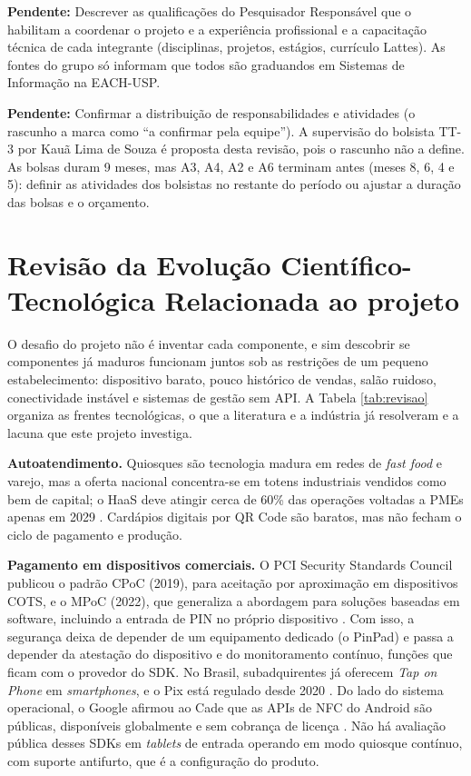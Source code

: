 \documentclass[12pt,a4paper]{article}
\newcommand{\pendente}[1]{\begin{pendbox}\textbf{\color{pendfg}Pendente:} #1\end{pendbox}}
\begin{document}
\pendente{Descrever as qualificações do Pesquisador Responsável que o habilitam a coordenar o projeto e a experiência profissional e a capacitação técnica de cada integrante (disciplinas, projetos, estágios, currículo Lattes). As fontes do grupo só informam que todos são graduandos em Sistemas de Informação na EACH-USP.}

\pendente{Confirmar a distribuição de responsabilidades e atividades (o rascunho a marca como ``a confirmar pela equipe''). A supervisão do bolsista TT-3 por Kauã Lima de Souza é proposta desta revisão, pois o rascunho não a define. As bolsas duram 9 meses, mas A3, A4, A2 e A6 terminam antes (meses 8, 6, 4 e 5): definir as atividades dos bolsistas no restante do período ou ajustar a duração das bolsas e o orçamento.}

\section{Revisão da Evolução Científico-Tecnológica Relacionada ao projeto}

O desafio do projeto não é inventar cada componente, e sim descobrir se componentes já maduros funcionam juntos sob as restrições de um pequeno estabelecimento: dispositivo barato, pouco histórico de vendas, salão ruidoso, conectividade instável e sistemas de gestão sem API. A Tabela \ref{tab:revisao} organiza as frentes tecnológicas, o que a literatura e a indústria já resolveram e a lacuna que este projeto investiga.

\textbf{Autoatendimento.} Quiosques são tecnologia madura em redes de \textit{fast food} e varejo, mas a oferta nacional concentra-se em totens industriais vendidos como bem de capital; o HaaS deve atingir cerca de 60\% das operações voltadas a PMEs apenas em 2029 \cite{pegn2026, genialtec2026}. Cardápios digitais por QR Code são baratos, mas não fecham o ciclo de pagamento e produção.

\textbf{Pagamento em dispositivos comerciais.} O PCI Security Standards Council publicou o padrão CPoC (2019), para aceitação por aproximação em dispositivos COTS, e o MPoC (2022), que generaliza a abordagem para soluções baseadas em software, incluindo a entrada de PIN no próprio dispositivo \cite{pci_cpoc, pci_mpoc}. Com isso, a segurança deixa de depender de um equipamento dedicado (o PinPad) e passa a depender da atestação do dispositivo e do monitoramento contínuo, funções que ficam com o provedor do SDK. No Brasil, subadquirentes já oferecem \textit{Tap on Phone} em \textit{smartphones}, e o Pix está regulado desde 2020 \cite{bcb_pix}. Do lado do sistema operacional, o Google afirmou ao Cade que as APIs de NFC do Android são públicas, disponíveis globalmente e sem cobrança de licença \cite{folha_cade}. Não há avaliação pública desses SDKs em \textit{tablets} de entrada operando em modo quiosque contínuo, com suporte antifurto, que é a configuração do produto.
\end{document}
